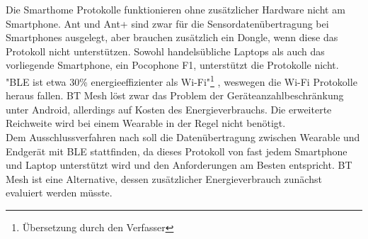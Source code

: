Die Smarthome Protokolle funktionieren ohne zusätzlicher Hardware nicht am Smartphone.
Ant und Ant+ sind zwar für die Sensordatenübertragung bei Smartphones ausgelegt, aber brauchen zusätzlich ein Dongle, wenn diese das Protokoll nicht unterstützen.
Sowohl handelsübliche Laptops als auch das vorliegende Smartphone, ein Pocophone F1, unterstützt die Protokolle nicht.\\
"BLE ist etwa 30\% energieeffizienter als Wi-Fi"\footnote{Übersetzung durch den Verfasser} \cite{comparison_wifi_ble}, weswegen die Wi-Fi Protokolle heraus fallen.
BT Mesh löst zwar das Problem der Geräteanzahlbeschränkung unter Android, allerdings auf Kosten des Energieverbrauchs.
Die erweiterte Reichweite wird bei einem Wearable in der Regel nicht benötigt.\\
Dem Ausschlussverfahren nach soll die Datenübertragung zwischen Wearable und Endgerät mit BLE stattfinden, da dieses Protokoll von fast jedem Smartphone und Laptop unterstützt wird und den Anforderungen am Besten entspricht.
BT Mesh ist eine Alternative, dessen zusätzlicher Energieverbrauch zunächst evaluiert werden müsste.

